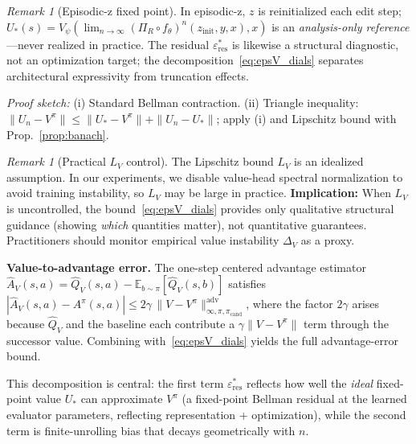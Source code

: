 \documentclass{article}
\theoremstyle{plain}
\theoremstyle{definition}
\theoremstyle{remark}
\newtheorem{remark}[theorem]{Remark}
\newcommand{\shortonly}[1]{#1}
\newcommand{\longonly}[1]{}
\newcommand{\shortonly}[1]{}
\newcommand{\longonly}[1]{#1}
\newcommand{\E}{\mathbb{E}}
\begin{document}
\begin{remark}[Episodic-z fixed point]
\label{rem:episodic_z_fp}
In episodic-z, $z$ is reinitialized each edit step; $U_*(s) = V_\psi(\lim_{n\to\infty} (\Pi_R \circ f_\theta)^n(z_{\text{init}}, y, x), x)$ is an \emph{analysis-only reference}---never realized in practice.
The residual $\varepsilon^*_{\text{res}}$ is likewise a structural diagnostic, not an optimization target; the decomposition~\eqref{eq:epsV_dials} separates architectural expressivity from truncation effects.
\end{remark}

\emph{Proof sketch:} (i) Standard Bellman contraction. (ii) Triangle inequality: $\|U_n - V^\pi\| \le \|U_* - V^\pi\| + \|U_n - U_*\|$; apply (i) and Lipschitz bound with Prop.~\ref{prop:banach}.

\begin{remark}[Practical $L_V$ control]
\label{rem:LV_practical}
The Lipschitz bound $L_V$ is an idealized assumption. In our experiments, we disable value-head spectral normalization to avoid training instability, so $L_V$ may be large in practice. 
\textbf{Implication:} When $L_V$ is uncontrolled, the bound~\eqref{eq:epsV_dials} provides only qualitative structural guidance (showing \emph{which} quantities matter), not quantitative guarantees. Practitioners should monitor empirical value instability $\Delta_V$ as a proxy.
\end{remark}
\longonly{The corresponding advantage-error bound is obtained by combining~\eqref{eq:epsV_dials} with Lemma~\ref{lem:A_error}, yielding Corollary~\ref{cor:epsA_dials}.}%
\shortonly{%
\textbf{Value-to-advantage error.}
The one-step centered advantage estimator $\widehat A_V(s,a)=\widehat Q_V(s,a)-\E_{b\sim\pi}[\widehat Q_V(s,b)]$
satisfies
$|\widehat A_V(s,a) - A^\pi(s,a)| \le 2\gamma\,\|V - V^\pi\|_{\infty,\pi,\pi_{\mathrm{cand}}}^{\mathrm{adv}}$,
where the factor $2\gamma$ arises because $\widehat Q_V$ and the baseline each contribute a $\gamma\|V-V^\pi\|$ term through the successor value.
Combining with~\eqref{eq:epsV_dials} yields the full advantage-error bound.}

This decomposition is central: the first term $\varepsilon_{\mathrm{res}}^*$ reflects how well the \emph{ideal} fixed-point value $U_*$ can approximate $V^\pi$ (a fixed-point Bellman residual at the learned evaluator parameters, reflecting representation + optimization), while the second term is finite-unrolling bias that decays geometrically with $n$.

\longonly{
The \emph{coefficient} $(1-\gamma^K)^{-1}$ decreases with $K$ and satisfies $(1-\gamma^K)^{-1} \le (1-\gamma)^{-1}$.
Thus, \emph{holding the $K$-step residual} $\|V-\mathcal{T}_K^\pi V\|_\infty$ fixed (or comparable across $K$), using a larger $K$ tightens the bound.
However, the residual itself depends on $K$ (e.g., $\varepsilon_{\mathrm{res}}^*(K)=\|U_*-\mathcal{T}_K^\pi U_*\|_\infty$) and need not decrease monotonically with $K$.
In practice, increasing $K$ also increases the \emph{variance} of the rollout return $G^{(K)}$, necessitating a bias-variance trade-off not captured by sup-norm analysis.}
\end{document}
